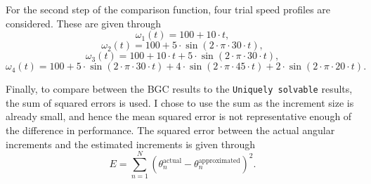\documentclass{article}
\begin{document}
	For the second step of the comparison function, four trial speed profiles are considered. These are given through
	\begin{equation}
		\omega_1(t) = 100 + 10 \cdot t,
	\end{equation}
	\begin{equation}
		\omega_2(t) = 100 + 5 \cdot \sin \left(2\cdot \pi \cdot 30 \cdot t \right),
	\end{equation}
	\begin{equation}
		\omega_3(t) = 100 + 10 \cdot t + 5 \cdot \sin \left(2\cdot \pi \cdot 30 \cdot t \right),
	\end{equation}
	\begin{equation}
		\omega_4(t) = 100 + 5 \cdot \sin \left(2\cdot \pi \cdot 30 \cdot t \right) + 4 \cdot \sin \left(2\cdot \pi \cdot 45 \cdot t \right) + 2 \cdot \sin \left(2\cdot \pi \cdot 20 \cdot t \right).
	\end{equation}
	
	Finally, to compare between the BGC results to the \texttt{Uniquely solvable} results, the sum of squared errors is used. I chose to use the sum as the increment size is already small, and hence the mean squared error is not representative enough of the difference in performance. The squared error between the actual angular increments and the estimated increments is given through
	\begin{equation}
		E = \sum_{n=1}^{N} \left( \theta_{n}^{\text{actual}} - \theta_{n}^{\text{approximated}} \right)^2.
	\end{equation}
	
\end{document}
